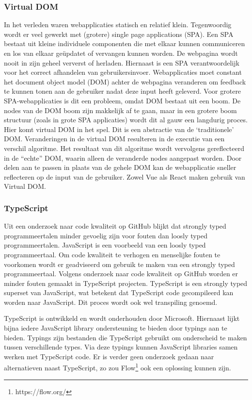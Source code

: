 \pagebreak
\subsubsection{Virtual DOM}
In het verleden waren webapplicaties statisch en relatief klein. Tegenwoordig wordt er veel gewerkt met (grotere) single page applications (SPA). Een SPA bestaat uit kleine individuele componenten die met elkaar kunnen communiceren en los van elkaar geüpdatet of vervangen kunnen worden\cite{SPA}. De webpagina wordt nooit in zijn geheel ververst of herladen. Hiernaast is een SPA verantwoordelijk voor het correct afhandelen van gebruikersinvoer.
Webapplicaties moet constant het document object model (DOM) achter de webpagina veranderen om feedback te kunnen tonen aan de gebruiker nadat deze input heeft geleverd. Voor grotere SPA-webapplicaties is dit een probleem, omdat DOM bestaat uit een boom. De nodes van de DOM boom zijn makkelijk af te gaan, maar in een grotere boom structuur (zoals in grote SPA applicaties) wordt dit al gauw een langdurig proces.
Hier komt virtual DOM in het spel. Dit is een abstractie van de ‘traditionele’ DOM\cite{Psaila2008}. Veranderingen in de virtual DOM resulteren in de executie van een verschil algoritme. Het resultaat van dit algoritme wordt vervolgens gereflecteerd in de “echte” DOM, waarin alleen de veranderde nodes aangepast worden. Door delen aan te passen in plaats van de gehele DOM kan de webapplicatie sneller reflecteren op de input van de gebruiker.
Zowel Vue als React maken gebruik van Virtual DOM.

\subsubsection{TypeScript}
Uit een onderzoek naar code kwaliteit op GitHub blijkt dat strongly typed programmeertalen minder gevoelig zijn voor fouten dan loosly typed programmeertalen\cite{Ray2014}. JavaScript is een voorbeeld van een loosly typed programmeertaal. Om code kwaliteit te verhogen en menselijke fouten te voorkomen wordt er geadviseerd om gebruik te maken van een strongly typed programmeertaal. Volgens onderzoek naar code kwaliteit op GitHub worden er minder fouten gemaakt in TypeScript projecten\cite{Ray2014}. TypeScript is een strongly typed superset van JavaScript, wat betekent dat TypeScript code gecompileerd kan worden naar JavaScript. Dit proces wordt ook wel transpiling genoemd.

TypeScript is ontwikkeld en wordt onderhouden door Microsoft. Hiernaast lijkt bijna iedere JavaScript library ondersteuning te bieden door typings aan te bieden. Typings zijn bestanden die TypeScript gebruikt om onderscheid te maken tussen verschillende types. Via deze typings kunnen JavaScript libraries samen werken met TypeScript code. 
Er is verder geen onderzoek gedaan naar alternatieven naast TypeScript, zo zou Flow\footnote{https://flow.org/} ook een oplossing kunnen zijn.

